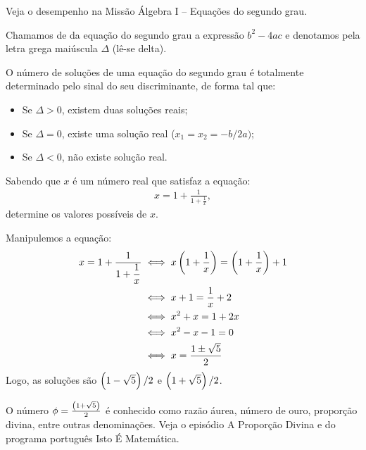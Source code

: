 \begin{onlineact}
Veja o desempenho na Missão Álgebra I -- Equações do segundo grau.
\end{onlineact}

\begin{definition}
Chamamos de  da equação do segundo grau a expressão $b^2-4ac$ e denotamos pela letra grega maiúscula $\Delta$ (lê-se delta).
\end{definition}

\begin{remark}
O número de soluções de uma equação do segundo grau é totalmente determinado pelo sinal do seu discriminante, de forma tal que:
%
\begin{itemize}
  \item Se $\Delta > 0$, existem duas soluções reais;
  \item Se $\Delta = 0 $, existe uma solução real ($x_1 = x_2 =
  -b/2a)$;
  \item Se $\Delta < 0$, não existe solução real.
\end{itemize}
\end{remark}

\begin{example}
Sabendo que $x$ é um número real que satisfaz a equação: 
%
\begin{align*}
x = 1 + \frac 1 {1 +\frac 1 x},
\end{align*}
%
\noindent determine os valores possíveis de $x$.

\end{example}

\begin{solution}
Manipulemos a equação:
%
\begin{align*}
x = 1+\dfrac{1}{1+\dfrac{1}{x}} & \iff x\left(1+\dfrac{1}{x}\right) = \left(1+\dfrac{1}{x}\right)+1\\
	& \iff x+1 = \dfrac{1}{x}+2\\
	& \iff x^2+x=1+2x\\
	& \iff x^2-x-1=0\\
	& \iff x=\dfrac{1\pm\sqrt5}{2}
\end{align*}
%
Logo, as soluções são $\left(1-\sqrt5\right)/2$ e $\left(1+\sqrt5\right)/2$.
\end{solution}

\begin{remark}
O número $\phi = \frac{\left(1+\sqrt 5\right)}2$ é conhecido como razão áurea, número de ouro, proporção divina, entre outras denominações.
Veja o episódio A Proporção Divina  e  do programa português Isto É Matemática.
\end{remark}

